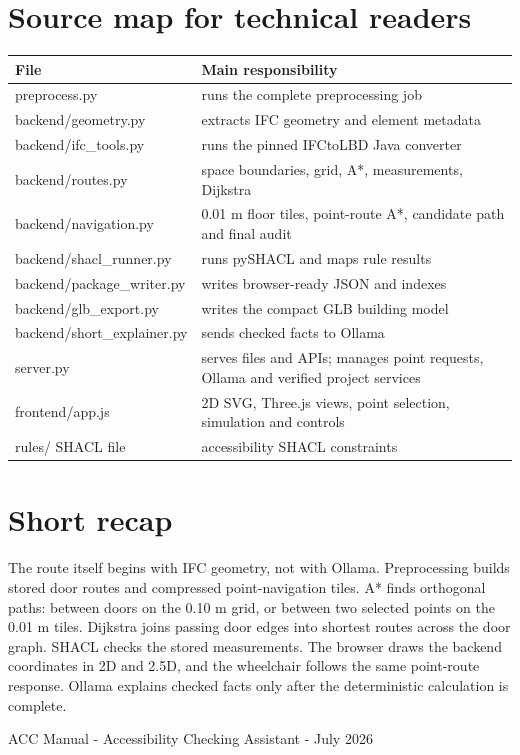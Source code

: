 \documentclass[11pt,a4paper]{article}
\begin{document}
\section{Source map for technical readers}
\scriptsize\begin{tabularx}{\textwidth}{>{\ttfamily}p{40mm}X}
\toprule
File & Main responsibility \\
\midrule
preprocess.py & runs the complete preprocessing job \\
backend/geometry.py & extracts IFC geometry and element metadata \\
backend/ifc\_tools.py & runs the pinned IFCtoLBD Java converter \\
backend/routes.py & space boundaries, grid, A*, measurements, Dijkstra \\
backend/navigation.py & 0.01 m floor tiles, point-route A*, candidate path and final audit \\
backend/shacl\_runner.py & runs pySHACL and maps rule results \\
backend/package\_writer.py & writes browser-ready JSON and indexes \\
backend/glb\_export.py & writes the compact GLB building model \\
backend/short\_explainer.py & sends checked facts to Ollama \\
server.py & serves files and APIs; manages point requests, Ollama and verified project services \\
frontend/app.js & 2D SVG, Three.js views, point selection, simulation and controls \\
rules/ SHACL file & accessibility SHACL constraints \\
\bottomrule
\end{tabularx}
\normalsize

\section{Short recap}
The route itself begins with IFC geometry, not with Ollama. Preprocessing builds stored door routes and compressed point-navigation tiles. A* finds orthogonal paths: between doors on the 0.10 m grid, or between two selected points on the 0.01 m tiles. Dijkstra joins passing door edges into shortest routes across the door graph. SHACL checks the stored measurements. The browser draws the backend coordinates in 2D and 2.5D, and the wheelchair follows the same point-route response. Ollama explains checked facts only after the deterministic calculation is complete.

\vfill
\begin{center}\color{muted}\small ACC Manual - Accessibility Checking Assistant - July 2026\end{center}
\end{document}

